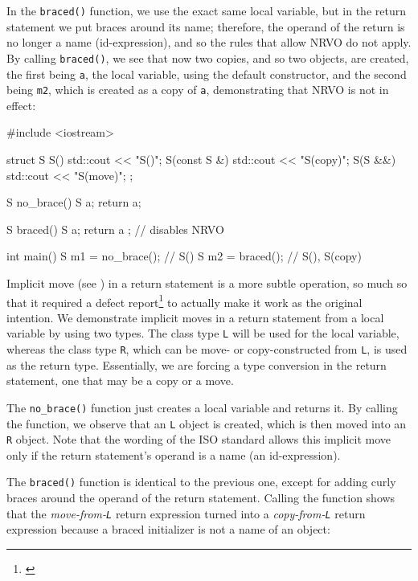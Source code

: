 In the \lstinline!braced()! function, we use the exact same local variable,
but in the return statement we put braces around its name; therefore,
the operand of the return is no longer a name (id-expression), and so
the rules that allow NRVO do not apply. By calling \lstinline!braced()!, we
see that now two copies, and so two objects, are created, the first
being \lstinline!a!, the local variable, using the default constructor, and
the second being \lstinline!m2!, which is created as a copy of \lstinline!a!,
demonstrating that NRVO is not in effect:

\begin{emcppslisting}
#include <iostream>

struct S
{
    S()          { std::cout << "S()\n"; }
    S(const S &) { std::cout << "S(copy)\n"; }
    S(S &&)      { std::cout << "S(move)\n"; }
};

S no_brace()
{
    S a;
    return a;
}

S braced()
{
    S a;
    return { a };  // disables NRVO
}

int main()
{
    S m1 = no_brace();  // S()
    S m2 = braced();    // S(), S(copy)
}
\end{emcppslisting}


\noindent Implicit move (see ) in a return statement
is a more subtle operation, so much so that it required a defect
report{\cprotect\footnote{\cite{yasskin12}}} to actually
make it work as the original intention. We demonstrate implicit moves in
a return statement from a local variable by using two types. The class
type \lstinline!L! will be used for the local variable, whereas the class
type \lstinline!R!, which can be move- or copy-constructed from \lstinline!L!,
is used as the return type. Essentially, we are forcing a type
conversion in the return statement, one that may be a copy or a move.

The \lstinline!no_brace()! function just creates a local variable and
returns it. By calling the function, we observe that an \lstinline!L!
object is created, which is then moved into an \lstinline!R! object. Note
that the wording of the ISO standard allows this implicit move only if
the return statement's operand is a name (an id-expression).

The \lstinline!braced()! function is identical to the previous one, except
for adding curly braces around the operand of the return statement.
Calling the function shows that the \emph{move-from-\lstinline!L!} return
expression turned into a \emph{copy-from-\lstinline!L!} return expression
because a braced initializer is not a name of an object:

